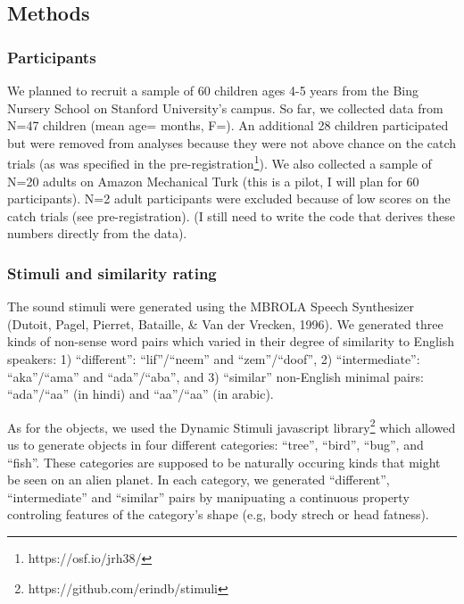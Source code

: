 \documentclass[10pt, letterpaper]{article}
\begin{document}
\subsection{Methods}\label{methods}

\subsubsection{Participants}\label{participants}

We planned to recruit a sample of 60 children ages 4-5 years from the
Bing Nursery School on Stanford University's campus. So far, we
collected data from N=47 children (mean age= months, F=). An additional
28 children participated but were removed from analyses because they
were not above chance on the catch trials (as was specified in the
pre-registration\footnote{https://osf.io/jrh38/}). We also collected a
sample of N=20 adults on Amazon Mechanical Turk (this is a pilot, I will
plan for 60 participants). N=2 adult participants were excluded because
of low scores on the catch trials (see pre-registration). (I still need
to write the code that derives these numbers directly from the data).

\subsubsection{Stimuli and similarity
rating}\label{stimuli-and-similarity-rating}

The sound stimuli were generated using the MBROLA Speech Synthesizer
(Dutoit, Pagel, Pierret, Bataille, \& Van der Vrecken, 1996). We
generated three kinds of non-sense word pairs which varied in their
degree of similarity to English speakers: 1) ``different'':
``lif''/``neem'' and ``zem''/``doof'', 2) ``intermediate'':
``aka''/``ama'' and ``ada''/``aba'', and 3) ``similar'' non-English
minimal pairs: ``ada''/``aa'' (in hindi) and
``aa''/``a\textipa{\textcrh}a'' (in arabic).

As for the objects, we used the Dynamic Stimuli javascript
library\footnote{https://github.com/erindb/stimuli} which allowed us to
generate objects in four different categories: ``tree'', ``bird'',
``bug'', and ``fish''. These categories are supposed to be naturally
occuring kinds that might be seen on an alien planet. In each category,
we generated ``different'', ``intermediate'' and ``similar'' pairs by
manipuating a continuous property controling features of the category's
shape (e.g, body strech or head fatness).
\end{document}

